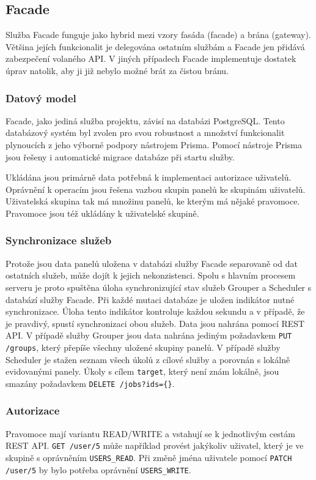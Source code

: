 \subsection{Facade}
Služba Facade funguje jako hybrid mezi vzory fasáda (facade) a brána (gateway). Většina jejích funkcionalit je delegována ostatním službám a Facade jen přidává zabezpečení volaného API. V jiných případech Facade implementuje dostatek úprav natolik, aby ji již nebylo možné brát za čistou bránu.

\subsubsection{Datový model}
Facade, jako jediná služba projektu, závisí na databázi PostgreSQL. Tento databázový systém byl zvolen pro svou robustnost a množství funkcionalit plynoucích z jeho výborné podpory nástrojem Prisma. Pomocí nástroje Prisma jsou řešeny i automatické migrace databáze při startu služby.

Ukládána jsou primárně data potřebná k implementaci autorizace uživatelů. Oprávnění k operacím jsou řešena vazbou skupin panelů ke skupinám uživatelů. Uživatelská skupina tak má množinu panelů, ke kterým má nějaké pravomoce. Pravomoce jsou též ukládány k uživatelské skupině.

\subsubsection{Synchronizace služeb}
Protože jsou data panelů uložena v databázi služby Facade separovaně od dat ostatních služeb, může dojít k jejich nekonzistenci. Spolu s hlavním procesem serveru je proto spuštěna úloha synchronizující stav služeb Grouper a Scheduler s databází služby Facade. Při každé mutaci databáze je uložen indikátor nutné synchronizace. Úloha tento indikátor kontroluje každou sekundu a v případě, že je pravdivý, spustí synchronizaci obou služeb. Data jsou nahrána pomocí REST API. V případě služby Grouper jsou data nahrána jediným požadavkem \lstinline|PUT /groups|, který přepíše všechny uložené skupiny panelů. V případě služby Scheduler je stažen seznam všech úkolů z cílové služby a porovnán s lokálně evidovanými panely. Úkoly s cílem \lstinline|target|, který není znám lokálně, jsou smazány požadavkem \lstinline|DELETE /jobs?ids={}|.

\subsubsection{Autorizace}
Pravomoce mají variantu READ/WRITE a vstahují se k jednotlivým cestám REST API. \lstinline|GET /user/5| může například provést jakýkoliv uživatel, který je ve skupině s oprávněním \lstinline{USERS_READ}. Při změně jména uživatele pomocí \lstinline|PATCH /user/5| by bylo potřeba oprávnění \lstinline{USERS_WRITE}.

